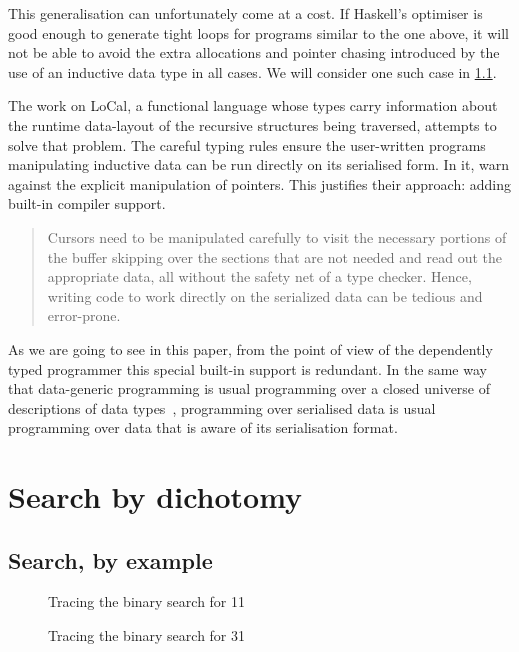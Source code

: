 \documentclass{article}
\begin{document}
This generalisation can unfortunately come at a cost. If Haskell's optimiser is
good enough to generate tight loops for programs similar to the one above, it
will not be able to avoid the extra allocations and pointer chasing introduced by
the use of an inductive data type in all cases. We will consider one such case in
\cref{example:search}.

The work on LoCal, a functional language whose types carry information about the
runtime data-layout of the recursive structures being traversed, attempts to solve
that problem. The careful typing rules ensure the user-written programs manipulating
inductive data can be run directly on its serialised form.
%
In it, \citet{DBLP:conf/pldi/VollmerKRS0N19} warn against the explicit manipulation
of pointers. This justifies their approach: adding built-in compiler support.

\begin{quote}
  Cursors need to be manipulated carefully to visit the necessary portions
  of the buffer skipping over the sections that are not needed and read out
  the appropriate data, all without the safety net of a type checker. Hence,
  writing code to work directly on the serialized data can be tedious and
  error-prone.
\end{quote}

As we are going to see in this paper, from the point of view of the dependently
typed programmer this special built-in support is redundant.
%
In the same way that data-generic programming is usual programming over a closed
universe of descriptions of data types~\citep{DBLP:conf/ifip2-1/AltenkirchM02},
programming over serialised data is usual programming over data that is aware
of its serialisation format.

\section{Search by dichotomy}


\subsection{Search, by example}
\label{example:search}

\begin{figure}
  \center
  \caption{Tracing the binary search for 11}
\end{figure}

\begin{figure}
  \center
  \caption{Tracing the binary search for 31}
\end{figure}
\end{document}

